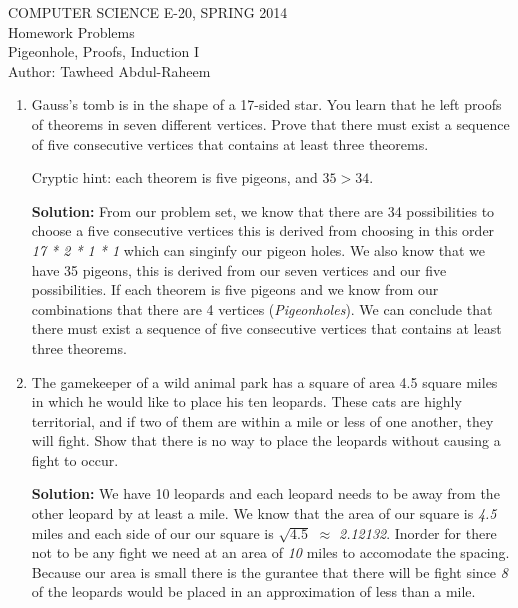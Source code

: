 \documentclass[12pt]{article}
\begin{document}
\begin{center}
    COMPUTER SCIENCE E-20, SPRING 2014 \\
    Homework Problems\\
    Pigeonhole, Proofs, Induction I \\
    Author: Tawheed Abdul-Raheem
\end{center}

\smallskip

\begin{enumerate}

    \item Gauss's tomb is in the shape of a 17-sided star. You learn that he left proofs of theorems in seven different vertices. Prove that there must exist a sequence of five consecutive vertices that contains at least three theorems.

        Cryptic hint: each theorem is five pigeons, and $35 > 34$.

        \textbf{Solution: } 
        From our problem set, we know that there are 34 possibilities to choose a five consecutive vertices this is derived
        from choosing in this order {\em 17 * 2 * 1 * 1} which can singinfy our pigeon holes. We also know that we have
        35 pigeons, this is derived from our seven vertices and our five possibilities. If each theorem is five pigeons and we know from our combinations that there are 4 vertices ({\em Pigeonholes}). We can conclude that there must exist a sequence of five consecutive vertices that contains at least three theorems.

    \item The gamekeeper of a wild animal park has a square of area 4.5 square miles in which he would like to place his ten leopards. These cats are highly territorial, and if two of them are within a mile or less of one another, they will fight. Show that there is no way to place the leopards without causing a fight to occur.

        \textbf{Solution: } 
        We have 10 leopards and each leopard needs to be away from the other leopard by at least a mile. We know that the area of our square is
        {\em 4.5} miles and each side of our our square is $\sqrt{4.5}$ $\approx$ {\em 2.12132}. 
        Inorder for there not to be any fight we need at an area
        of {\em 10} miles to accomodate the spacing. Because our area is small there is the gurantee that there will be fight since {\em 8} of the
        leopards would be placed in an approximation of less than a mile.


\end{enumerate}
\end{document}
